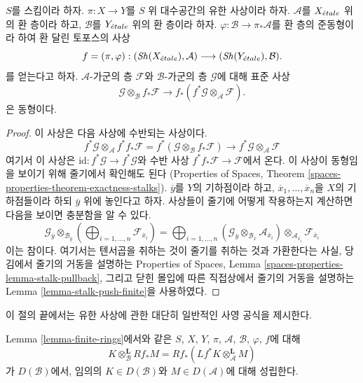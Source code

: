 \begin{lemma}
\label{lemma-finite-rings}
$S$를 스킴이라 하자. $\pi : X \to Y$를 $S$ 위 대수공간의 유한
사상이라 하자. $\mathcal{A}$를 $X_{\acute{e}tale}$ 위의 환 층이라 하고,
$\mathcal{B}$를 $Y_{\acute{e}tale}$ 위의 환 층이라 하자.
$\varphi : \mathcal{B} \to \pi_*\mathcal{A}$를 환 층의 준동형이라 하여
환 달린 토포스의 사상
$$
f = (\pi, \varphi) :
(\mathop{\mathit{Sh}}\nolimits(X_{\acute{e}tale}), \mathcal{A})
\longrightarrow
(\mathop{\mathit{Sh}}\nolimits(Y_{\acute{e}tale}), \mathcal{B}).
$$
를 얻는다고 하자. $\mathcal{A}$-가군의 층 $\mathcal{F}$와
$\mathcal{B}$-가군의 층 $\mathcal{G}$에 대해 표준 사상
$$
\mathcal{G} \otimes_\mathcal{B} f_*\mathcal{F}
\longrightarrow
f_*(f^*\mathcal{G} \otimes_\mathcal{A} \mathcal{F}).
$$
은 동형이다.
\end{lemma}

\begin{proof}
이 사상은 다음 사상에 수반되는 사상이다.
$$
f^*\mathcal{G} \otimes_\mathcal{A}
f^* f_*\mathcal{F} =
f^*(\mathcal{G} \otimes_\mathcal{B} f_*\mathcal{F})
\longrightarrow
f^*\mathcal{G} \otimes_\mathcal{A} \mathcal{F}
$$
여기서 이 사상은 $\text{id} : f^*\mathcal{G} \to f^*\mathcal{G}$와
수반 사상 $f^* f_*\mathcal{F} \to \mathcal{F}$에서 온다.
이 사상이 동형임을 보이기 위해 줄기에서 확인해도 된다
(Properties of Spaces, Theorem
\ref{spaces-properties-theorem-exactness-stalks}).
$\overline{y}$를 $Y$의 기하점이라 하고,
$\overline{x}_1, \ldots, \overline{x}_n$을 $X$의 기하점들이라 하되
$\overline{y}$ 위에 놓인다고 하자. 사상들이 줄기에 어떻게 작용하는지
계산하면 다음을 보이면 충분함을 알 수 있다.
$$
\mathcal{G}_{\overline{y}}
\otimes_{\mathcal{B}_{\overline{y}}}
\left(
\bigoplus\nolimits_{i = 1, \ldots, n} \mathcal{F}_{\overline{x}_i}
\right) =
\bigoplus\nolimits_{i = 1, \ldots, n}
(\mathcal{G}_{\overline{y}}
\otimes_{\mathcal{B}_{\overline{x}}}
\mathcal{A}_{\overline{x}_i}) \otimes_{\mathcal{A}_{\overline{x}_i}}
\mathcal{F}_{\overline{x}_i}
$$
이는 참이다. 여기서는 텐서곱을 취하는 것이 줄기를 취하는 것과
가환한다는 사실, 당김에서 줄기의 거동을 설명하는 Properties of Spaces,
Lemma \ref{spaces-properties-lemma-stalk-pullback}, 그리고
닫힌 몰입에 따른 직접상에서 줄기의 거동을 설명하는
Lemma \ref{lemma-stalk-push-finite}을 사용하였다.
\end{proof}

\noindent
이 절의 끝에서는 유한 사상에 관한 대단히 일반적인 사영 공식을 제시한다.

\begin{lemma}
\label{lemma-projection-formula-finite}
Lemma \ref{lemma-finite-rings}에서와 같은 $S$, $X$, $Y$, $\pi$,
$\mathcal{A}$, $\mathcal{B}$, $\varphi$, $f$에 대해
$$
K \otimes_\mathcal{B}^\mathbf{L} Rf_*M =
Rf_*(Lf^*K \otimes_\mathcal{A}^\mathbf{L} M)
$$
가 $D(\mathcal{B})$에서, 임의의 $K \in D(\mathcal{B})$와
$M \in D(\mathcal{A})$에 대해 성립한다.
\end{lemma}

